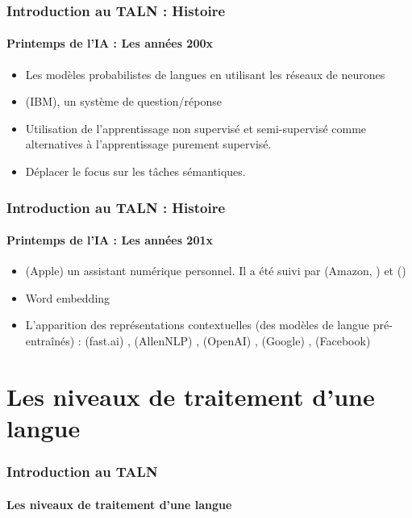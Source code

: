 \documentclass[xcolor=table]{beamer}
\begin{document}
\begin{frame}
\frametitle{Introduction au TALN : Histoire}
\framesubtitle{Printemps de l'IA : Les années 200x}

\begin{itemize}
	\item {} Les modèles probabilistes de langues en utilisant les réseaux de neurones \cite{2003-bengio-al}
	\item {}  (IBM), un système de question/réponse
	\item Utilisation de l'apprentissage non supervisé et semi-supervisé comme alternatives à l'apprentissage purement supervisé.
	\item Déplacer le focus sur les tâches sémantiques.
\end{itemize}

\end{frame}

\begin{frame}
\frametitle{Introduction au TALN : Histoire}
\framesubtitle{Printemps de l'IA : Les années 201x}

\begin{itemize}
	\item {}  (Apple)  un assistant numérique personnel. Il a été suivi par  (Amazon, ) et  ()
	\item {} Word embedding \cite{2014-lebret-collobert}
	\item {} L'apparition des représentations contextuelles (des modèles de langue pré-entraînés) :  (fast.ai) \cite{2018-howard-ruder},  (AllenNLP) \cite{2018-peters-al},  (OpenAI) \cite{2018-radford-al},  (Google) \cite{2018-devlin-al},  (Facebook) \cite{2019-lample-conneau}
\end{itemize}

\end{frame}

\section{Les niveaux de traitement d'une langue}

\begin{frame}
\frametitle{Introduction au TALN}
\framesubtitle{Les niveaux de traitement d'une langue}


\end{frame}
\end{document}
